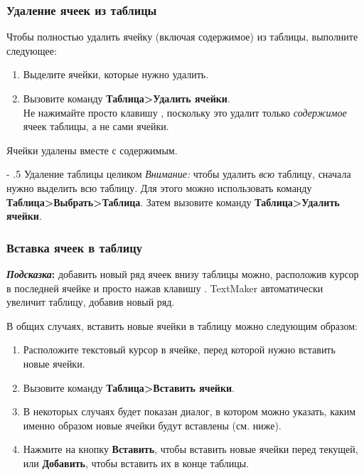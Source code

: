 \documentclass[a4paper,10pt]{article}
\makeatletter
\renewcommand\paragraph{%
   \@startsection{paragraph}{4}{0mm}%
      {-\baselineskip}%
      {.5\baselineskip}%
      {\normalfont\normalsize\bfseries}}
\makeatother
\begin{document}
\subsubsection{Удаление ячеек из таблицы}
Чтобы полностью удалить ячейку (включая содержимое) из таблицы, выполните следующее:
\begin{enumerate}
 \item Выделите ячейки, которые нужно удалить.
 \item Вызовите команду \textbf{Таблица>Удалить ячейки}.\\
 Не нажимайте просто клавишу , поскольку это удалит только \textit{содержимое} ячеек таблицы, а не сами ячейки.
\end{enumerate}

Ячейки удалены вместе с содержимым.

\paragraph{Удаление таблицы целиком}
\textit{Внимание:} чтобы удалить \textit{всю} таблицу, сначала нужно выделить всю таблицу. Для этого можно использовать команду \textbf{Таблица>Выбрать>Таблица}. Затем вызовите команду \textbf{Таблица>Удалить ячейки}.

\subsubsection{Вставка ячеек в таблицу}
\begin{mdframed}[backgroundcolor=blue!10]
\textbf{\textit{Подсказка}:} добавить новый ряд ячеек внизу таблицы можно, расположив курсор в последней ячейке и просто нажав клавишу . TextMaker автоматически увеличит таблицу, добавив новый ряд.
\end{mdframed}

В общих случаях, вставить новые ячейки в таблицу можно следующим образом:
\begin{enumerate}
 \item Расположите текстовый курсор в ячейке, перед которой нужно вставить новые ячейки.
 \item Вызовите команду \textbf{Таблица>Вставить ячейки}.
 \item В некоторых случаях будет показан диалог, в котором можно указать, каким именно образом новые ячейки будут вставлены (см. ниже).
 \item Нажмите на кнопку \textbf{Вставить}, чтобы вставить новые ячейки перед текущей, или \textbf{Добавить}, чтобы вставить их в конце таблицы.
\end{enumerate}
\end{document}
